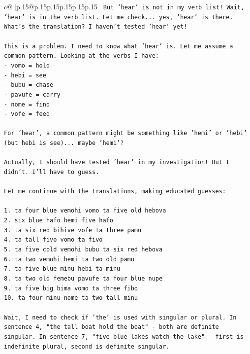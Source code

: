 \documentclass{article}
\begin{document}
{\begin{supertabular}{c@{$\;$}|p{.15\linewidth}@{}p{.15\linewidth}p{.15\linewidth}p{.15\linewidth}p{.15\linewidth}p{.15\linewidth}}
{{{\texttt{   But 'hear' is not in my verb list! Wait, 'hear' is in the verb list. Let me check... yes, 'hear' is there. What's the translation? I haven't tested 'hear' yet!} \\
\\ 
\texttt{This is a problem. I need to know what 'hear' is. Let me assume a common pattern. Looking at the verbs I have:} \\
\texttt{{-} vomo = hold} \\
\texttt{{-} hebi = see} \\
\texttt{{-} bubu = chase} \\
\texttt{{-} pavufe = carry} \\
\texttt{{-} nome = find} \\
\texttt{{-} vofe = feed} \\
\\ 
\texttt{For 'hear', a common pattern might be something like 'hemi' or 'hebi' (but hebi is see)... maybe 'hemi'?} \\
\\ 
\texttt{Actually, I should have tested 'hear' in my investigation! But I didn't. I'll have to guess.} \\
\\ 
\texttt{Let me continue with the translations, making educated guesses:} \\
\\ 
\texttt{1. ta four blue vemohi vomo ta five old hebova} \\
\texttt{2. six blue hafo hemi five hafo} \\
\texttt{3. ta six red bihive vofe ta three pamu} \\
\texttt{4. ta tall fivo vomo ta fivo} \\
\texttt{5. ta five cold vemohi bubu ta six red hebova} \\
\texttt{6. ta two vemohi hemi ta two old pamu} \\
\texttt{7. ta five blue minu hebi ta minu} \\
\texttt{8. ta two old femebu pavufe ta four blue nupe} \\
\texttt{9. ta five big bima vomo ta three fibo} \\
\texttt{10. ta four minu nome ta two tall minu} \\
\\ 
\texttt{Wait, I need to check if 'the' is used with singular or plural. In sentence 4, "the tall boat hold the boat" {-} both are definite singular. In sentence 7, "five blue lakes watch the lake" {-} first is indefinite plural, second is definite singular.} \\
}}}
\end{supertabular}}
\end{document}
